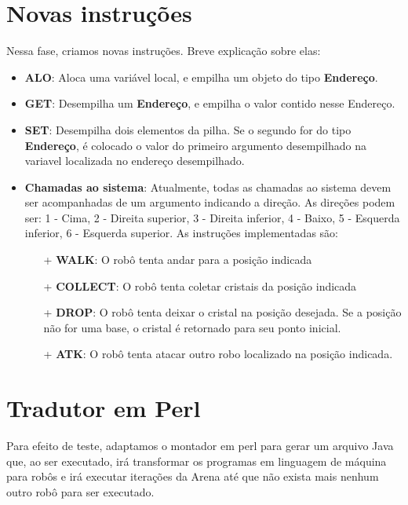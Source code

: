 \documentclass[11pt]{article}
\begin{document}
\section{Novas instruções}

Nessa fase, criamos novas instruções. Breve explicação sobre elas:

\begin{itemize}

	\item \textbf{ALO}: Aloca uma variável local, e empilha um objeto do tipo \textbf{\color{red}Endereço}.
	\item \textbf{GET}: Desempilha um \textbf{\color{red}Endereço}, e empilha o valor contido nesse Endereço.
	\item \textbf{SET}: Desempilha dois elementos da pilha. Se o segundo for do tipo \textbf{\color{red}Endereço},
	é colocado o valor do primeiro argumento desempilhado na variavel localizada no endereço desempilhado.
	\item \textbf{Chamadas ao sistema}: Atualmente, todas as chamadas ao sistema devem ser acompanhadas de um argumento indicando a direção. As direções podem ser: 1 - Cima, 2 - Direita superior, 3 - Direita inferior, 4 - Baixo, 5 - Esquerda inferior, 6 - Esquerda superior. As instruções implementadas são:
		\begin{itemize}

		\item[+] \textbf{WALK}: O robô tenta andar para a posição indicada
		\item[+] \textbf{COLLECT}: O robô tenta coletar cristais da posição indicada
		\item[+] \textbf{DROP}: O robô tenta deixar o cristal na posição desejada. Se a posição não for uma base, o cristal é retornado para seu ponto inicial.
		\item[+] \textbf{ATK}: O robô tenta atacar outro robo localizado na posição indicada.

		\end{itemize}

\end{itemize}


\section{Tradutor em Perl}

Para efeito de teste, adaptamos o montador em perl para gerar um arquivo Java que, ao ser executado, irá transformar os programas em linguagem de máquina para robôs e irá executar iterações da Arena até que não exista mais nenhum outro robô para ser executado.
\end{document}
